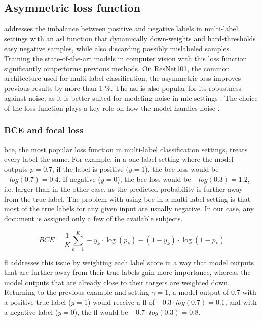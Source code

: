 \subsection{Asymmetric loss function} \label{hmc_asl}

\cite{ben2020asymmetric} addresses the imbalance between positive and negative labels in multi-label settings with an \acrfull{asl} function that dynamically down-weights and hard-thresholds easy negative samples, while also discarding possibly mislabeled samples. Training the state-of-the-art models in computer vision with this loss function significantly outperforms previous methods. On ResNet101, the common architecture used for multi-label classification, the asymmetric loss improves previous results by more than 1 \%. The \acrshort{asl} is also popular for its robustness against noise, as it is better suited for modeling noise in \acrshort{mlc} settings \cite{zhao2021evaluating}. The choice of the loss function plays a key role on how the model handles noise \cite{karimi2020deep}.

\subsubsection{BCE and focal loss}

\acrfull{bce}, the most popular loss function in multi-label classification settings, treats every label the same. For example, in a one-label setting where the model outputs $p=0.7$, if the label is positive ($y=1$), the \acrshort{bce} loss would be $-log(0.7) = 0.4$. If negative ($y=0$), the \acrshort{bce} loss would be $-log(0.3) = 1.2$, i.e. larger than in the other case, as the predicted probability is further away from the true label. The problem with using \acrshort{bce} in a multi-label setting is that most of the true labels for any given input are usually negative. In our case, any document is assigned only a few of the available subjects.

$$ BCE = \frac{1}{K} \sum_{k=1}^K -y_k \cdot \log (p_k) - (1-y_k) \cdot \log (1-p_k) $$

\acrfull{fl} addresses this issue by weighting each label score in a way that model outputs that are further away from their true labels gain more importance, whereas the model outputs that are already close to their targets are weighted down. Returning to the previous example and setting $\gamma=1$, a model output of $0.7$ with a positive true label ($y=1$) would receive a \acrshort{fl} of $-0.3 \cdot log(0.7) = 0.1$, and with a negative label ($y=0$), the \acrshort{fl} would be $-0.7 \cdot log(0.3) = 0.8$.

